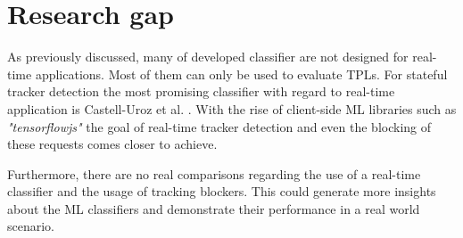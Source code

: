 \section{Research gap}

As previously discussed, many of developed classifier are not designed for real-time applications. Most of them can only
be used to evaluate TPLs. For stateful tracker detection the most promising classifier with regard to real-time application is
Castell-Uroz et al. \cite{castell2020url}. With the rise of client-side ML libraries such as \emph{"tensorflowjs"} the goal of
real-time tracker detection and even the blocking of these requests comes closer to achieve.

Furthermore, there are no real comparisons regarding the use of a real-time classifier and the usage of tracking blockers. This could
generate more insights about the ML classifiers and demonstrate their performance in a real world scenario.

